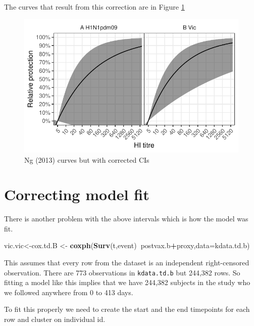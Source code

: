 \documentclass[]{article}
\newenvironment{Shaded}{\begin{snugshade}}{\end{snugshade}}
\newcommand{\DataTypeTok}[1]{\textcolor[rgb]{0.13,0.29,0.53}{#1}}
\newcommand{\KeywordTok}[1]{\textcolor[rgb]{0.13,0.29,0.53}{\textbf{#1}}}
\newcommand{\NormalTok}[1]{#1}
\newcommand{\OperatorTok}[1]{\textcolor[rgb]{0.81,0.36,0.00}{\textbf{#1}}}
\newcommand{\StringTok}[1]{\textcolor[rgb]{0.31,0.60,0.02}{#1}}
\begin{document}
The curves that result from this correction are in Figure \ref{fig:cicurves}

\begin{figure}
\centering
\includegraphics{../fit-cox-plot/sophia-ci.pdf}
\caption{\label{fig:cicurves}Ng (2013) curves but with corrected CIs}
\end{figure}

\pagebreak

\hypertarget{correcting-model-fit}{%
\section{Correcting model fit}\label{correcting-model-fit}}

There is another problem with the above intervals which is how the model was fit.

\begin{Shaded}
\begin{Highlighting}[]
\NormalTok{vic.vic<-cox.td.B <-}\StringTok{ }\KeywordTok{coxph}\NormalTok{(}\KeywordTok{Surv}\NormalTok{(t,event)}\OperatorTok{~}\NormalTok{postvax.b}\OperatorTok{+}\NormalTok{proxy,}\DataTypeTok{data=}\NormalTok{kdata.td.b)}
\end{Highlighting}
\end{Shaded}

This assumes that every row from the dataset is an independent right-censored observation. There are 773 observations in \texttt{kdata.td.b} but 244,382 rows. So fitting a model like this implies that we have 244,382 subjects in the study who we followed anywhere from 0 to 413 days.

To fit this properly we need to create the start and the end timepoints for each row and cluster on individual id.
\end{document}
